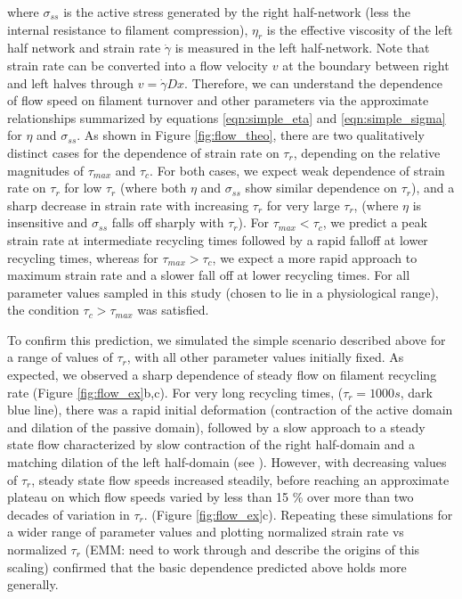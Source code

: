 \documentclass[10pt,letterpaper]{article}
\begin{document}
where $\sigma_{ss}$ is the active stress generated by the right half-network (less the internal resistance to filament compression), $\eta_r$ is the effective viscosity of the left half network and strain rate $\dot{\gamma}$ is measured in the left half-network.  Note that strain rate can be converted into a flow velocity $v$ at the boundary between right and left halves through $ v = \dot{\gamma}Dx$. Therefore, we can understand the dependence of flow speed on filament turnover and other parameters via the approximate relationships summarized by equations \ref{eqn:simple_eta} and \ref{eqn:simple_sigma} for $\eta$ and $\sigma_{ss}$.  As shown in Figure \ref{fig:flow_theo},  there are two qualitatively distinct cases for the dependence of strain rate on $\tau_r$, depending on the relative magnitudes of $\tau_{max}$ and $\tau_c$.  For both cases, we expect weak dependence of strain rate on $\tau_r$ for low $\tau_r$ (where both $\eta$ and $\sigma_{ss}$ show similar dependence on $\tau_r$), and a sharp decrease in strain rate with increasing $\tau_r$ for very large $\tau_r$, (where $\eta$ is insensitive and $\sigma_{ss}$ falls off sharply with $\tau_r$). For $\tau_{max} < \tau_c$, we predict a peak strain rate at intermediate recycling times followed by a rapid falloff at lower recycling times, whereas for $\tau_{max} > \tau_c$, we expect a more rapid approach to maximum strain rate and a slower fall off at lower recycling times.  For all parameter values sampled in this study (chosen to lie in a physiological range), the condition $\tau_c > \tau_{max}$ was satisfied.

To confirm this prediction, we simulated the simple scenario described above for a range of values of $\tau_r$, with all other parameter values initially fixed. As expected, we observed a sharp dependence of steady flow on filament recycling rate (Figure \ref{fig:flow_ex}b,c). For very long recycling times, ($\tau_r=1000 s$, dark blue line), there was a rapid initial deformation (contraction of the active domain and dilation of the passive domain), followed by a slow approach to a steady state flow characterized by slow contraction of the right half-domain and a matching dilation of the left half-domain (see ).  However, with decreasing values of $\tau_r$, steady state flow speeds increased steadily, before reaching an approximate plateau on which flow speeds varied by less than 15 \% over more than two decades of variation in $\tau_r$.  (Figure \ref{fig:flow_ex}c).  Repeating these simulations for a wider range of parameter values and plotting normalized strain rate vs normalized $\tau_r$ (EMM:  need to work through and describe the origins of this scaling) confirmed that the basic dependence predicted above holds more generally.
\end{document}
